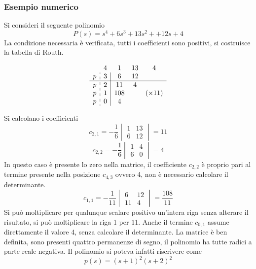 \subsubsection{Esempio numerico}
Si consideri il seguente polinomio
$$
P(s) = s^4+6s^3 + 13s^2 + +12s +4
$$
La condizione necessaria è verificata, tutti i coefficienti sono positivi, si
costruisce la tabella di Routh.
\begin{table}[h]
$$
\begin{array}{c:c|ccc}
  & 4 & 1 & 13 & 4\\
p & 3 & 6 & 12 \\ \hline
p & 2 & 11 & 4 \\
p & 1 & 108 & & (\times11)\\
p & 0 & 4
\end{array}
$$
\end{table}
Si calcolano i coefficienti
$$
c_{2,1} = -\frac{1}{6}\begin{vmatrix}
1 & 13\\
6 & 12
\end{vmatrix} = 11
$$
$$
c_{2,2} = -\frac{1}{6}\begin{vmatrix}
1 & 4\\
6 & 0
\end{vmatrix} = 4
$$
In questo caso è presente lo zero nella matrice, il coefficiente $c_{2,2}$ è
proprio pari al termine presente nella posizione
$c_{4,3}$ ovvero 4, non è necessario calcolare il determinante.
$$
c_{1,1} = -\frac{1}{11}\begin{vmatrix}
6 & 12 \\
11 & 4
\end{vmatrix} = \frac{108}{11}
$$
Si può moltiplicare per qualunque scalare positivo un'intera riga senza
alterare il risultato, si può moltiplicare la riga 1 per 11.
Anche il termine $c_{0,1}$ assume direttamente il valore 4, senza calcolare il
determinante.
La matrice è ben definita, sono presenti quattro permanenze di segno, il
polinomio ha tutte radici a parte reale negativa. Il polinomio si poteva
infatti riscrivere come
$$
p(s) = (s+1)^2(s+2)^2
$$
